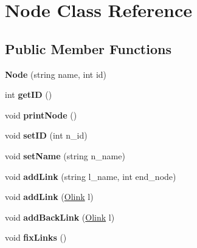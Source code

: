 \hypertarget{classNode}{\section{\-Node \-Class \-Reference}
\label{classNode}
}
\subsection*{\-Public \-Member \-Functions}
\begin{DoxyCompactItemize}
\item 
\hypertarget{classNode_ac3de42feca64e8339bce2b5ad362cfdd}{{\bfseries \-Node} (string name, int id)}\label{classNode_ac3de42feca64e8339bce2b5ad362cfdd}

\item 
\hypertarget{classNode_a8dd9a1d6ac9638fd1168283ad47e5127}{int {\bfseries get\-I\-D} ()}\label{classNode_a8dd9a1d6ac9638fd1168283ad47e5127}

\item 
\hypertarget{classNode_a61ebf57072e40bc120434d11017ec349}{void {\bfseries print\-Node} ()}\label{classNode_a61ebf57072e40bc120434d11017ec349}

\item 
\hypertarget{classNode_a4cca3354a2b078ef7ee33e4fce43e43c}{void {\bfseries set\-I\-D} (int n\-\_\-id)}\label{classNode_a4cca3354a2b078ef7ee33e4fce43e43c}

\item 
\hypertarget{classNode_a900888a6a596426e35557121935483c2}{void {\bfseries set\-Name} (string n\-\_\-name)}\label{classNode_a900888a6a596426e35557121935483c2}

\item 
\hypertarget{classNode_a8dd9febb9afb965cf17964a739cfddb5}{void {\bfseries add\-Link} (string l\-\_\-name, int end\-\_\-node)}\label{classNode_a8dd9febb9afb965cf17964a739cfddb5}

\item 
\hypertarget{classNode_a33cff6599c8aaca35a183b115f0f3168}{void {\bfseries add\-Link} (\hyperlink{classOlink}{\-Olink} l)}\label{classNode_a33cff6599c8aaca35a183b115f0f3168}

\item 
\hypertarget{classNode_a72f64b6329c0b09fbafc48fa7e1b1eb8}{void {\bfseries add\-Back\-Link} (\hyperlink{classOlink}{\-Olink} l)}\label{classNode_a72f64b6329c0b09fbafc48fa7e1b1eb8}

\item 
\hypertarget{classNode_a95c8387c110c2a4dfb16734519c2ed45}{void {\bfseries fix\-Links} ()}\label{classNode_a95c8387c110c2a4dfb16734519c2ed45}


\end{DoxyCompactItemize}
